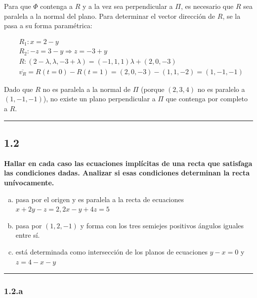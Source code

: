 \documentclass{article}
\begin{document}
Para que $\Phi$ contenga a $R$ y a la vez sea perpendicular a $\Pi$, es necesario que $R$ sea paralela a la normal del plano. Para determinar el vector dirección de $R$, se la pasa a su forma paramétrica:

\begin{subequations}
\begin{align}
& R_1: x = 2 - y \\
& R_2: -z = 3 - y \Rightarrow z = -3 + y \\
& R: (2-\lambda, \lambda, -3+\lambda) = (-1, 1, 1) \lambda + (2, 0, -3) \\
& \overline{v_R} = R(t=0) - R(t=1) = (2, 0, -3) - (1, 1, -2) = (1, -1, -1)
\end{align}
\end{subequations}

Dado que $R$ no es paralela a la normal de $\Pi$ (porque $(2, 3, 4)$ no es paralelo a $(1, -1, -1)$), no existe un plano perpendicular a $\Pi$ que contenga por completo a $R$. 

\vspace{10 pt}
\hrule

\subsection*{1.2}
\label{subsec:1.2}

\textbf{Hallar en cada caso las ecuaciones implícitas de una recta que satisfaga las condiciones dadas. Analizar si esas condiciones determinan la recta unívocamente.} 

\begin{enumerate}[(a)]
\bfseries
\item pasa por el origen y es paralela a la recta de ecuaciones $x + 2y -z = 2, 2x - y + 4z = 5$

\item pasa por $(1, 2, -1)$ y forma con los tres semiejes positivos ángulos iguales entre sí.

\item está determinada como intersección de los planos de ecuaciones $y-x = 0$ y $z = 4 - x - y$
\end{enumerate}
\hrule

\subsubsection*{1.2.a}
\label{subsubsec:1.2.a}
\end{document}
